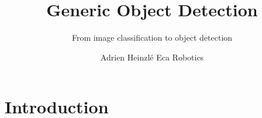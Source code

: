 \documentclass{beamer}
\title{Generic Object Detection}
\subtitle{From image classification to object detection}
\author{Adrien Heinzlé \newline Eca Robotics}
\begin{document}
\begin{frame}
    \titlepage
\end{frame}

\AtBeginSection[ ]
{
\begin{frame}
    \tableofcontents[currentsection]
\end{frame}
}

%
%
%


\part{Introduction}
\begin{frame}
	\partpage
\end{frame}
\end{document}
